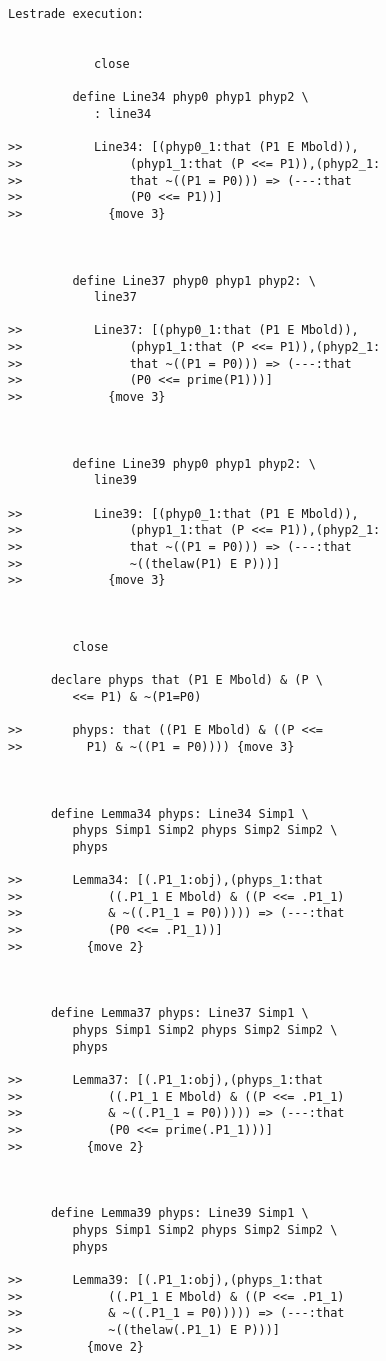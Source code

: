 \documentclass[12pt]{article}
\begin{document}
\begin{verbatim}Lestrade execution:


            close

         define Line34 phyp0 phyp1 phyp2 \
            : line34

>>          Line34: [(phyp0_1:that (P1 E Mbold)),
>>               (phyp1_1:that (P <<= P1)),(phyp2_1:
>>               that ~((P1 = P0))) => (---:that
>>               (P0 <<= P1))]
>>            {move 3}



         define Line37 phyp0 phyp1 phyp2: \
            line37

>>          Line37: [(phyp0_1:that (P1 E Mbold)),
>>               (phyp1_1:that (P <<= P1)),(phyp2_1:
>>               that ~((P1 = P0))) => (---:that
>>               (P0 <<= prime(P1)))]
>>            {move 3}



         define Line39 phyp0 phyp1 phyp2: \
            line39

>>          Line39: [(phyp0_1:that (P1 E Mbold)),
>>               (phyp1_1:that (P <<= P1)),(phyp2_1:
>>               that ~((P1 = P0))) => (---:that
>>               ~((thelaw(P1) E P)))]
>>            {move 3}



         close

      declare phyps that (P1 E Mbold) & (P \
         <<= P1) & ~(P1=P0)

>>       phyps: that ((P1 E Mbold) & ((P <<=
>>         P1) & ~((P1 = P0)))) {move 3}



      define Lemma34 phyps: Line34 Simp1 \
         phyps Simp1 Simp2 phyps Simp2 Simp2 \
         phyps

>>       Lemma34: [(.P1_1:obj),(phyps_1:that
>>            ((.P1_1 E Mbold) & ((P <<= .P1_1)
>>            & ~((.P1_1 = P0))))) => (---:that
>>            (P0 <<= .P1_1))]
>>         {move 2}



      define Lemma37 phyps: Line37 Simp1 \
         phyps Simp1 Simp2 phyps Simp2 Simp2 \
         phyps

>>       Lemma37: [(.P1_1:obj),(phyps_1:that
>>            ((.P1_1 E Mbold) & ((P <<= .P1_1)
>>            & ~((.P1_1 = P0))))) => (---:that
>>            (P0 <<= prime(.P1_1)))]
>>         {move 2}



      define Lemma39 phyps: Line39 Simp1 \
         phyps Simp1 Simp2 phyps Simp2 Simp2 \
         phyps

>>       Lemma39: [(.P1_1:obj),(phyps_1:that
>>            ((.P1_1 E Mbold) & ((P <<= .P1_1)
>>            & ~((.P1_1 = P0))))) => (---:that
>>            ~((thelaw(.P1_1) E P)))]
>>         {move 2}


\end{verbatim}
\end{document}
